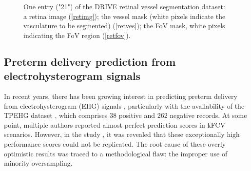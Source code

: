 \documentclass[3p, times]{elsarticle}
\begin{document}
\begin{figure}[t]
\begin{center}
\end{center}
\caption{One entry ("21") of the DRIVE retinal vessel segmentation dataset: a retina image (\ref{retimg}); the vessel mask (white pixels indicate the vasculature to be segmented) (\ref{retves}); the FoV mask, white pixels indicating the FoV region (\ref{retfov}).}
\label{fig:retina}
\end{figure}
    
\subsection{Preterm delivery prediction from electrohysterogram signals}
\label{sec:ehg}

In recent years, there has been growing interest in predicting preterm delivery from electrohysterogram (EHG) signals \cite{ehgreview}, particularly with the availability of the TPEHG dataset \cite{tpehg}, which comprises 38 positive and 262 negative records.
At some point, multiple authors reported almost perfect prediction scores in kFCV scenarios. However, in the study \cite{ehg}, it was revealed that these exceptionally high performance scores could not be replicated. The root cause of these overly optimistic results was traced to a methodological flaw: the improper use of minority oversampling.
\end{document}
